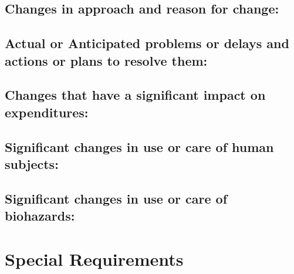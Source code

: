 \documentclass{article}
\begin{document}
\subsection*{Changes in approach and reason for change:}
\vspace{5mm}
\subsection*{Actual or Anticipated problems or delays and actions or plans to resolve them:}
\vspace{5mm}
\subsection*{Changes that have a significant impact on expenditures:}
\vspace{5mm}
\subsection*{Significant changes in use or care of human subjects:}
\vspace{5mm}
\subsection*{Significant changes in use or care of biohazards:}
\vspace{5mm}
\newpage
\section*{Special Requirements}
\end{document}
